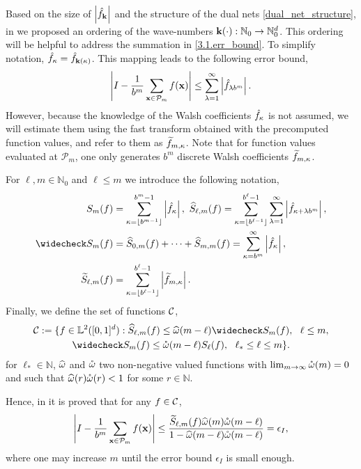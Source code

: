 Based on the size of $\left\lvert\hat{f}_{\boldsymbol{\mathbf{k}}}\right\rvert$ and the structure of the dual nets \eqref{dual_net_structure}, in \cite[Sec. 4.1]{HicJim} we proposed an ordering of the wave-numbers $\boldsymbol{\mathbf{k}}(\cdot):\mathbb{N}_0\rightarrow\mathbb{N}_0^d$. This ordering will be helpful to address the summation in \eqref{3.1.err_bound}. To simplify notation, $\hat{f}_{\kappa}=\hat{f}_{\boldsymbol{\mathbf{k}}(\kappa)}$. This mapping leads to the following error bound,
\begin{equation}
\left\lvert I - \frac{1}{b^m}\sum_{\boldsymbol{\mathbf{x}}\in\mathcal{P}_m}f(\boldsymbol{\mathbf{x}})\right\rvert \le \sum_{\lambda=1}^{\infty} \left \lvert \hat{f}_{\lambda b^m}\right \rvert.
\end{equation}
However, because the knowledge of the Walsh coefficients $\hat{f}_{\kappa}$ is not assumed, we will estimate them using the fast transform obtained with the precomputed function values, and refer to them as $\widetilde{f}_{m,\kappa}$. Note that for function values evaluated at $\mathcal{P}_m$, one only generates $b^m$ discrete Walsh coefficients $\widetilde{f}_{m,\kappa}$.

For $\ell,m \in \mathbb{N}_0$ and $\ell \le m$ we introduce the following notation,
\begin{align*}
S_m(f) &=  \sum_{\kappa=\left \lfloor b^{m-1} \right \rfloor}^{b^{m}-1} \absolute{\hf_{\kappa}}, \ 
\hS_{\ell,m}(f)  = \sum_{\kappa=\left \lfloor b^{\ell-1} \right \rfloor}^{b^{\ell}-1} \sum_{\lambda=1}^{\infty} \absolute{ \hf_{\kappa+\lambda b^{m}}}, \\
\wcS_m(f)&=\hS_{0,m}(f) + \cdots + \hS_{m,m}(f)=
\sum_{\kappa=b^{m}}^{\infty} \absolute{\hf_{\kappa}},\\ 
\tS_{\ell,m}(f) &= \sum_{\kappa=\left \lfloor b^{\ell-1}\right \rfloor}^{b^{\ell}-1} \absolute{\tf_{m,\kappa}}.
\end{align*}
Finally, we define the set of functions $\mathcal{C}$,
\begin{multline} \label{conecond}
\cc:=\{f \in \mathbb{L}^2(\cube) : \hS_{\ell,m}(f) \le \homega(m-\ell) \wcS_m(f),\ \ \ell \le m, \\
\wcS_m(f) \le \wcomega(m-\ell) S_{\ell}(f),\ \  \ell_* \le \ell \le m\}.
\end{multline}
for $\ell_* \in \mathbb{N}$, $\widehat{\omega}$ and $\mathring{\omega}$ two non-negative valued functions with $\lim_{m \to \infty} \mathring{\omega}(m) = 0$ and such that $\widehat{\omega}(r)\mathring{\omega}(r)<1$ for some $r\in\mathbb{N}$.

Hence, in \cite[Sec. 4.2]{HicJim} it is proved that for any $f\in\mathcal{C}$,
\begin{equation}
\left\lvert I - \frac{1}{b^m}\sum_{\boldsymbol{\mathbf{x}}\in\mathcal{P}_m}f(\boldsymbol{\mathbf{x}})\right\rvert
\le \frac{\widetilde{S}_{\ell,m}(f)\widehat{\omega}(m) \mathring{\omega}(m-\ell)}{1 - \widehat{\omega}(m-\ell) \mathring{\omega}(m-\ell)}=\epsilon_{I}, \label{errbd}
\end{equation}
where one may increase $m$ until the error bound $\epsilon_{I}$ is small enough.


